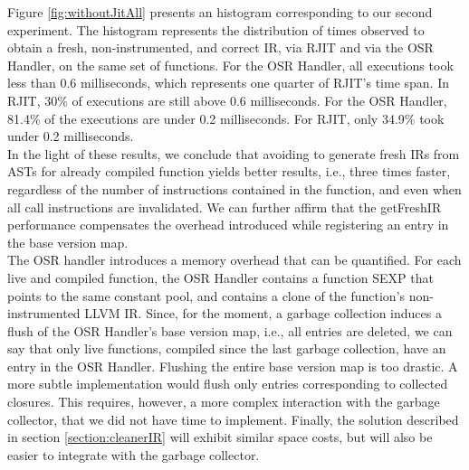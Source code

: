 Figure \ref{fig:withoutJitAll} presents an histogram corresponding to our second experiment.
The histogram represents the distribution of times observed to obtain a fresh, non-instrumented, and correct IR, via RJIT and via the OSR Handler, on the same set of functions.
For the OSR Handler, all executions took less than 0.6 milliseconds, which represents one quarter of RJIT's time span.
In RJIT, 30\% of executions are still above 0.6 milliseconds.
For the OSR Handler, 81.4\% of the executions are under 0.2 milliseconds.
For RJIT, only 34.9\% took under 0.2 milliseconds.\\

In the light of these results, we conclude that avoiding to generate fresh IRs from ASTs for already compiled function yields better results, i.e., three times faster, regardless of the number of instructions contained in the function, and even when all call instructions are invalidated.
We can further affirm that the getFreshIR performance compensates the overhead introduced while registering an entry in the base version map.\\

The OSR handler introduces a memory overhead that can be quantified.
For each live and compiled function, the OSR Handler contains a function SEXP that points to the same constant pool, and contains a clone of the function's non-instrumented LLVM IR.
Since, for the moment, a garbage collection induces a flush of the OSR Handler's base version map, i.e., all entries are deleted, we can say that only live functions, compiled since the last garbage collection, have an entry in the OSR Handler.
Flushing the entire base version map is too drastic. 
A more subtle implementation would flush only entries corresponding to collected closures.
This requires, however, a more complex interaction with the garbage collector, that we did not have time to implement.
Finally, the solution described in section \ref{section:cleanerIR} will exhibit similar space costs, but will also be easier to integrate with the garbage collector.\\
